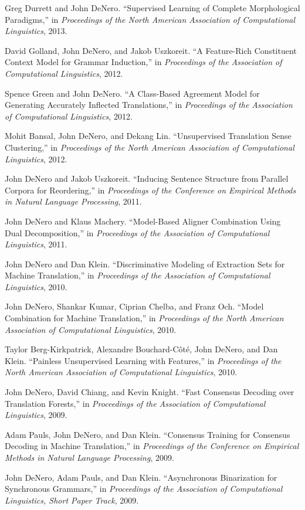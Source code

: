 \documentclass[margin,line]{res}
\begin{document}
\begin{resume}
Greg Durrett and John DeNero.  ``Supervised Learning of Complete Morphological Paradigms,'' in {\it Proceedings of the North American Association of Computational Linguistics}, 2013.

David Golland, John DeNero, and Jakob Uszkoreit. ``A Feature-Rich Constituent Context Model for Grammar Induction,'' in {\it Proceedings of the Association of Computational Linguistics}, 2012.

Spence Green and John DeNero. ``A Class-Based Agreement Model for Generating Accurately Inflected Translations,'' in {\it Proceedings of the Association of Computational Linguistics}, 2012.

Mohit Bansal, John DeNero, and Dekang Lin. ``Unsupervised Translation Sense Clustering,'' in {\it Proceedings of the North American Association of Computational Linguistics}, 2012.

John DeNero and Jakob Uszkoreit.  ``Inducing Sentence Structure from Parallel Corpora for Reordering,'' in {\it Proceedings of the Conference on Empirical Methods in Natural Language Processing}, 2011.

John DeNero and Klaus Machery. ``Model-Based Aligner Combination Using Dual Decomposition,'' in {\it Proceedings of the Association of Computational Linguistics}, 2011.

John DeNero and Dan Klein. ``Discriminative Modeling of Extraction Sets for Machine Translation,'' in {\it Proceedings of the Association of Computational Linguistics}, 2010.

John DeNero, Shankar Kumar, Ciprian Chelba, and Franz Och. ``Model Combination for Machine Translation,'' in {\it Proceedings of the North American Association of Computational Linguistics}, 2010.

Taylor Berg-Kirkpatrick, Alexandre Bouchard-Côté, John DeNero, and Dan Klein. ``Painless Unsupervised Learning with Features,'' in {\it Proceedings of the North American Association of Computational Linguistics}, 2010.

John DeNero, David Chiang, and Kevin Knight. ``Fast Consensus Decoding over Translation Forests,'' in {\it Proceedings of the Association of Computational Linguistics}, 2009.

Adam Pauls, John DeNero, and Dan Klein. ``Consensus Training for Consensus Decoding in Machine Translation,'' in {\it Proceedings of the Conference on Empirical Methods in Natural Language Processing}, 2009.

John DeNero, Adam Pauls, and Dan Klein. ``Asynchronous Binarization for Synchronous Grammars,'' in {\it Proceedings of the Association of Computational Linguistics, Short Paper Track}, 2009.


\end{resume}
\end{document}
